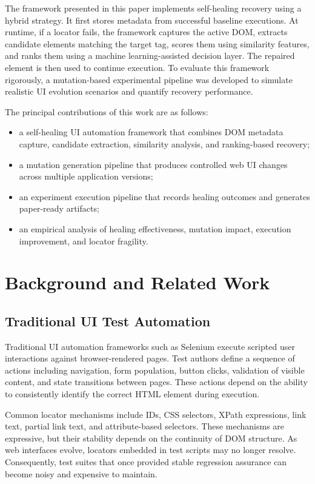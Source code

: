\documentclass[conference]{IEEEtran}
\begin{document}
The framework presented in this paper implements self-healing recovery using a hybrid strategy. It first stores metadata from successful baseline executions. At runtime, if a locator fails, the framework captures the active DOM, extracts candidate elements matching the target tag, scores them using similarity features, and ranks them using a machine learning-assisted decision layer. The repaired element is then used to continue execution. To evaluate this framework rigorously, a mutation-based experimental pipeline was developed to simulate realistic UI evolution scenarios and quantify recovery performance.

The principal contributions of this work are as follows:

\begin{itemize}[leftmargin=1.2em]
    \item a self-healing UI automation framework that combines DOM metadata capture, candidate extraction, similarity analysis, and ranking-based recovery;
    \item a mutation generation pipeline that produces controlled web UI changes across multiple application versions;
    \item an experiment execution pipeline that records healing outcomes and generates paper-ready artifacts;
    \item an empirical analysis of healing effectiveness, mutation impact, execution improvement, and locator fragility.
\end{itemize}

\section{Background and Related Work}

\subsection{Traditional UI Test Automation}
Traditional UI automation frameworks such as Selenium execute scripted user interactions against browser-rendered pages. Test authors define a sequence of actions including navigation, form population, button clicks, validation of visible content, and state transitions between pages. These actions depend on the ability to consistently identify the correct HTML element during execution.

Common locator mechanisms include IDs, CSS selectors, XPath expressions, link text, partial link text, and attribute-based selectors. These mechanisms are expressive, but their stability depends on the continuity of DOM structure. As web interfaces evolve, locators embedded in test scripts may no longer resolve. Consequently, test suites that once provided stable regression assurance can become noisy and expensive to maintain.
\end{document}
